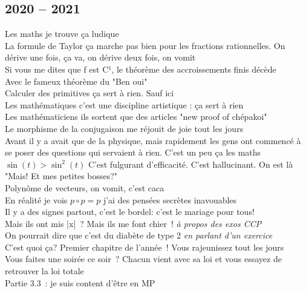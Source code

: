 \documentclass[french, a4paper, openany]{book}
\begin{document}
	\subsection*{2020 -- 2021}
		\noindent \og Les maths je trouve ça ludique \fg \\
		\og La formule de Taylor ça marche pas bien pour les fractions rationnelles. On dérive une fois, ça va, on dérive deux fois, on vomit \fg \\
		\og Si vous me dites que f est C¹, le théorème des accroissements finis décède \fg \\
		\og Avec le fameux théorème du "Ben oui" \fg \\
		\og Calculer des primitives ça sert à rien. Sauf ici \fg \\
		\og Les mathématiques c'est une discipline artistique : ça sert à rien \fg \\
		\og Les mathématiciens ils sortent que des articles "new proof of chépakoi" \fg \\
		\og Le morphisme de la conjugaison me réjouit de joie tout les jours \fg \\
		\og Avant il y a avait que de la physique, mais rapidement les gens ont commencé à se poser des questions qui servaient à rien. C'est un peu ça les maths \fg \\
		$\sin(t) > \sin^2(t)$ \og C'est fulgurant d'efficacité. C'est hallucinant. On est là "Mais! Et mes petites bosses?" \fg \\
		\og Polynôme de vecteurs, on vomit, c'est caca \fg \\
		\og En réalité je vois $p \circ p = p$ j'ai des pensées secrètes inavouables \fg \\
		\og Il y a des signes partout, c'est le bordel: c'est le mariage pour tous! \fg \\
		\og Mais ils ont mis |x|~? Mais ils me font chier~! \fg \emph{à propos des exos CCP} \\
		\og On pourrait dire que c'est du diabète de type 2 \fg \emph{en parlant d'un exercice} \\
		\og C'est quoi ça? Premier chapitre de l'année~! Vous rajeunissez tout les jours \fg \\
		\og Vous faites une soirée ce soir~? Chacun vient avec sa loi et vous essayez de retrouver la loi totale \fg \\
		\og Partie 3.3~: je suis content d'être en MP \fg \\
\end{document}
